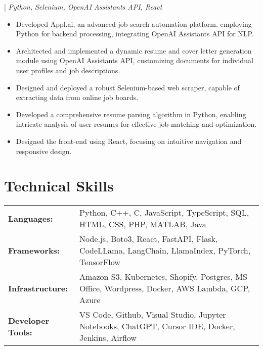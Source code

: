  | \emph{Python, Selenium, OpenAI Assistants API, React}
\begin{itemize} \itemsep -1pt
    \item Developed Appl.ai, an advanced job search automation platform, employing Python for backend processing, integrating OpenAI Assistants API for NLP.
    \item Architected and implemented a dynamic resume and cover letter generation module using OpenAI Assistants API, customizing documents for individual user profiles and job descriptions.
    \item Designed and deployed a robust Selenium-based web scraper, capable of extracting data from online job boards.
    \item Developed a comprehensive resume parsing algorithm in Python, enabling intricate analysis of user resumes for effective job matching and optimization.
    \item Designed the front-end using React, focusing on intuitive navigation and responsive design.
\end{itemize}

\section{Technical Skills}

\begin{tabularx}{\textwidth}{@{}lX@{}}
\textbf{Languages:}       & Python, C++, C, JavaScript, TypeScript, SQL, HTML, CSS, PHP, MATLAB, Java \\
\textbf{Frameworks:}     & Node.js, Boto3, React, FastAPI, Flask, CodeLLama, LangChain, LlamaIndex, PyTorch, TensorFlow \\
\textbf{Infrastructure:} & Amazon S3, Kubernetes, Shopify, Postgres, MS Office, Wordpress, Docker, AWS Lambda, GCP, Azure \\
\textbf{Developer Tools:}& VS Code, Github, Visual Studio, Jupyter Notebooks, ChatGPT, Cursor IDE, Docker, Jenkins, Airflow \\
\end{tabularx}

